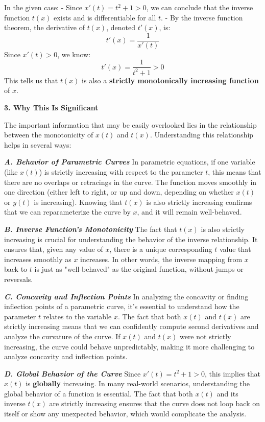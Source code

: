 \documentclass[a4paper,12pt]{book}
\begin{document}
In the given case:
- Since \( x'(t) = t^2 + 1 > 0 \), we can conclude that the inverse function \( t(x) \) exists and is differentiable for all \( t \).
- By the inverse function theorem, the derivative of \( t(x) \), denoted \( t'(x) \), is:
\[
t'(x) = \dfrac{1}{x'(t)}
\]
Since \( x'(t) > 0 \), we know:
\[
t'(x) = \dfrac{1}{t^2 + 1} > 0
\]
This tells us that \( t(x) \) is also a \textbf{strictly monotonically increasing function} of \( x \).

\textbf{3. Why This Is Significant}

The important information that may be easily overlooked lies in the relationship between the monotonicity of \( x(t) \) and \( t(x) \). Understanding this relationship helps in several ways:

\textbf{\textit{A. Behavior of Parametric Curves}}
In parametric equations, if one variable (like \( x(t) \)) is strictly increasing with respect to the parameter \( t \), this means that there are no overlaps or retracings in the curve. The function moves smoothly in one direction (either left to right, or up and down, depending on whether \( x(t) \) or \( y(t) \) is increasing). Knowing that \( t(x) \) is also strictly increasing confirms that we can reparameterize the curve by \( x \), and it will remain well-behaved.

\textbf{\textit{B. Inverse Function's Monotonicity}}
The fact that \( t(x) \) is also strictly increasing is crucial for understanding the behavior of the inverse relationship. It ensures that, given any value of \( x \), there is a unique corresponding \( t \) value that increases smoothly as \( x \) increases. In other words, the inverse mapping from \( x \) back to \( t \) is just as "well-behaved" as the original function, without jumps or reversals.

\textbf{\textit{C. Concavity and Inflection Points}}
In analyzing the concavity or finding inflection points of a parametric curve, it’s essential to understand how the parameter \( t \) relates to the variable \( x \). The fact that both \( x(t) \) and \( t(x) \) are strictly increasing means that we can confidently compute second derivatives and analyze the curvature of the curve. If \( x(t) \) and \( t(x) \) were not strictly increasing, the curve could behave unpredictably, making it more challenging to analyze concavity and inflection points.

\textbf{\textit{D. Global Behavior of the Curve}}
Since \( x'(t) = t^2 + 1 > 0 \), this implies that \( x(t) \) is \textbf{globally} increasing. In many real-world scenarios, understanding the global behavior of a function is essential. The fact that both \( x(t) \) and its inverse \( t(x) \) are strictly increasing ensures that the curve does not loop back on itself or show any unexpected behavior, which would complicate the analysis.
\end{document}
